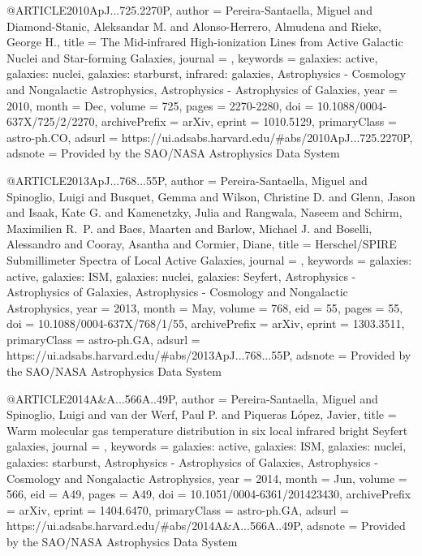 \documentclass[longauth]{aa}
\begin{document}
{{{@ARTICLE{2010ApJ...725.2270P,
       author = {{Pereira-Santaella}, Miguel and {Diamond-Stanic}, Aleksandar M. and {Alonso-Herrero}, Almudena and {Rieke}, George H.},
        title = {The Mid-infrared High-ionization Lines from Active Galactic Nuclei and Star-forming Galaxies},
      journal = {\apj},
     keywords = {galaxies: active, galaxies: nuclei, galaxies: starburst, infrared: galaxies, Astrophysics - Cosmology and Nongalactic Astrophysics, Astrophysics - Astrophysics of Galaxies},
         year = 2010,
        month = Dec,
       volume = {725},
        pages = {2270-2280},
          doi = {10.1088/0004-637X/725/2/2270},
archivePrefix = {arXiv},
       eprint = {1010.5129},
 primaryClass = {astro-ph.CO},
       adsurl = {https://ui.adsabs.harvard.edu/#abs/2010ApJ...725.2270P},
      adsnote = {Provided by the SAO/NASA Astrophysics Data System}
}

@ARTICLE{2013ApJ...768...55P,
       author = {{Pereira-Santaella}, Miguel and {Spinoglio}, Luigi and {Busquet}, Gemma and {Wilson}, Christine D. and {Glenn}, Jason and {Isaak}, Kate G. and {Kamenetzky}, Julia and {Rangwala}, Naseem and {Schirm}, Maximilien R.~P. and {Baes}, Maarten and {Barlow}, Michael J. and {Boselli}, Alessandro and {Cooray}, Asantha and {Cormier}, Diane},
        title = {Herschel/SPIRE Submillimeter Spectra of Local Active Galaxies},
      journal = {\apj},
     keywords = {galaxies: active, galaxies: ISM, galaxies: nuclei, galaxies: Seyfert, Astrophysics - Astrophysics of Galaxies, Astrophysics - Cosmology and Nongalactic Astrophysics},
         year = 2013,
        month = May,
       volume = {768},
          eid = {55},
        pages = {55},
          doi = {10.1088/0004-637X/768/1/55},
archivePrefix = {arXiv},
       eprint = {1303.3511},
 primaryClass = {astro-ph.GA},
       adsurl = {https://ui.adsabs.harvard.edu/#abs/2013ApJ...768...55P},
      adsnote = {Provided by the SAO/NASA Astrophysics Data System}
}

@ARTICLE{2014A&A...566A..49P,
       author = {{Pereira-Santaella}, Miguel and {Spinoglio}, Luigi and {van der Werf}, Paul P. and {Piqueras L{\'o}pez}, Javier}, 
       title = {Warm molecular gas temperature distribution in six local infrared bright Seyfert galaxies},
      journal = {\aap},
     keywords = {galaxies: active, galaxies: ISM, galaxies: nuclei, galaxies: starburst, Astrophysics - Astrophysics of Galaxies, Astrophysics - Cosmology and Nongalactic Astrophysics},
         year = 2014,
        month = Jun,
       volume = {566},
          eid = {A49},
        pages = {A49},
          doi = {10.1051/0004-6361/201423430},
archivePrefix = {arXiv},
       eprint = {1404.6470},
 primaryClass = {astro-ph.GA},
       adsurl = {https://ui.adsabs.harvard.edu/#abs/2014A&A...566A..49P},
      adsnote = {Provided by the SAO/NASA Astrophysics Data System}
}

}}}
\end{document}
